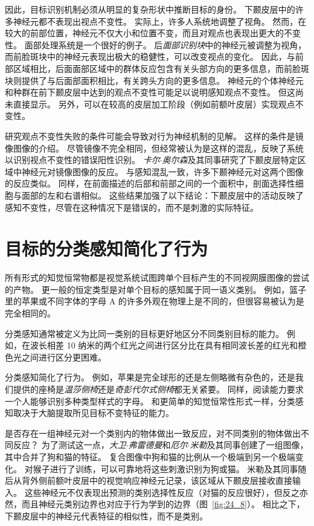 因此，目标识别机制必须从明显的复杂形状中推断目标的身份。
下颞皮层中的许多神经元都不表现出视点不变性。
实际上，许多人系统地调整了视角。
然而，在较大的前部位置，神经元不仅大小和位置不变，而且对观点也表现出更大的不变性。
面部处理系统是一个很好的例子。
后\textit{面部识别块}中的神经元被调整为视角，而前脸斑块中的神经元表现出极大的稳健性，可以改变视点的变化。
因此，与前部区域相比，后面面部区域中的群体反应包含有关头部方向的更多信息，而前脸斑块则提供了与后面部面积相比，有关跨头方向的更多信息。
神经元的个体神经元和种群在前下颞皮层中达到的观点不变性可能足以说明感知观点不变性。
但这尚未直接显示。
另外，可以在较高的皮层加工阶段（例如前额叶皮层）实现观点不变性。


研究观点不变性失败的条件可能会导致对行为神经机制的见解。
这样的条件是镜像图像的介绍。
尽管镜像不完全相同，但经常被认为是这样的混乱，反映了系统以识别视点不变性的错误阳性识别。
\textit{卡尔$\cdot$奥尔森}及其同事研究了下颞皮层特定区域中神经元对镜像图像的反应。
与感知混乱一致，许多下颞神经元对这两个图像的反应类似。
同样，在前面描述的后部和前部之间的一个面积中，剖面选择性细胞与面部的左和右谱相似。
这些结果加强了以下结论：下颞皮层中的活动反映了感知不变性，尽管在这种情况下是错误的，而不是刺激的实际特征。



\section{目标的分类感知简化了行为}

所有形式的知觉恒常物都是视觉系统试图跨单个目标产生的不同视网膜图像的尝试的产物。
更一般的恒定类型是对单个目标的感知属于同一语义类别。
例如，篮子里的苹果或不同字体的字母 A 的许多外观在物理上是不同的，但很容易被认为是完全相同的。


分类感知通常被定义为比同一类别的目标更好地区分不同类别目标的能力。
例如，在波长相差 10 纳米的两个红光之间进行区分比在具有相同波长差的红光和橙色光之间进行区分更困难。


分类感知简化了行为。
例如，苹果是完全球形的还是左侧略微有杂色的，还是我们提供的座椅是\textit{温莎侧椅}还是\textit{奇彭代尔式侧椅}都无关紧要。
同样，阅读能力要求一个人能够识别多种类型样式的字母。
和更简单的知觉恒常性形式一样，分类感知取决于大脑提取所见目标不变特征的能力。


是否存在一组神经元对一个类别内的物体做出一致反应，对不同类别的物体做出不同反应？
为了测试这一点，\textit{大卫$\cdot$弗雷德曼}和\textit{厄尔$\cdot$米勒}及其同事创建了一组图像，其中合并了狗和猫的特征。
复合图像中狗和猫的比例从一个极端到另一个极端变化。 
对猴子进行了训练，可以可靠地将这些刺激识别为狗或猫。
米勒及其同事随后从背外侧前额叶皮层中的视觉响应神经元记录，该区域从下颞皮层接收直接输入。
这些神经元不仅表现出预测的类别选择性反应（对猫的反应很好），但反之亦然，而且神经元类别边界也对应于行为学到的边界（图~\ref{fig:24_8}）。 
相比之下，下颞皮层中的神经元代表特征的相似性，而不是类别。


